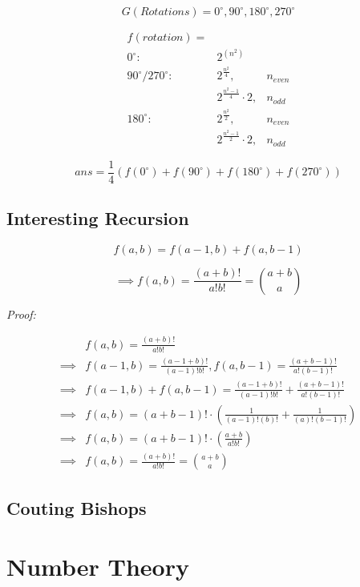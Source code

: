 	$$ G (Rotations) = 0^{\circ}, 90^{\circ}, 180^{\circ}, 270^{\circ} $$

	\begin{centering}
	\begin{align*}
	f(rotation) = & \\
	0^{\circ}: 				& 2^{(n^2)}  \\
	90^{\circ}/270^{\circ}:	& 2^{ \frac{n^2}{4} }, & n_{even} \\
							& 2^{ \frac{n^2-1}{4} } \cdot 2 , & n_{odd} \\
	180^{\circ}:			& 2^{ \frac{n^2}{2} }, & n_{even} \\
							& 2^{ \frac{n^2-1}{2} } \cdot 2 , & n_{odd}
	\end{align*}
	\end{centering}

	
	$$ans = \frac{1}{4} (f(0^{\circ}) + f(90^{\circ}) + f(180^{\circ}) + f(270^{\circ})) $$

	\subsection{Interesting Recursion}

	$$ f(a, b) = f(a-1, b) + f(a, b-1) $$

	$$ \implies f(a, b) = \frac{(a+b)!}{a! b!} = \binom{a+b}{a} $$

	\textit{Proof:}
	
	\begin{align*}
	&f(a, b) = \frac{(a+b)!}{a! b!}  \\ 
	\implies &f(a-1, b) = \frac{(a-1+b)!}{(a-1)! b!}, f(a, b-1) = \frac{(a+b-1)!}{a! (b-1)!}  \\
	\implies &f(a-1, b) + f(a, b-1) = \frac{(a-1+b)!}{(a-1)! b!} + \frac{(a+b-1)!}{a! (b-1)!}  \\
	\implies &f(a, b) = (a+b-1)! \cdot ( \frac{1}{(a-1)!(b)!} + \frac{1}{(a)!(b-1)!} )  \\
	\implies &f(a, b) = (a+b-1)! \cdot ( \frac{a+b}{a! b!} ) \\
	\implies &f(a, b) = \frac{(a+b)!}{a! b!} = \binom{a+b}{a} 
	\end{align*}

	\subsection{Couting Bishops}





\section{Number Theory}

